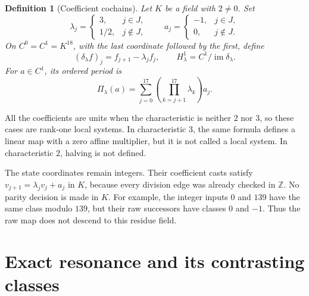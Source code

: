 \documentclass[11pt,letterpaper]{article}
\newcommand{\Z}{\mathbb{Z}}
\newtheorem{definition}[theorem]{Definition}
\begin{document}
\begin{definition}[Coefficient cochains]
Let \(K\) be a field with \(2\ne0\). Set
\[
\lambda_j=\begin{cases}3,&j\in J,\\1/2,&j\notin J,\end{cases}
\qquad
 a_j=\begin{cases}-1,&j\in J,\\0,&j\notin J.\end{cases}
\]
On \(C^0=C^1=K^{18}\), with the last coordinate followed by the first, define
\[
(\delta_\lambda f)_j=f_{j+1}-\lambda_jf_j,
\qquad H^1_\lambda=C^1/\operatorname{im}\delta_\lambda.
\]
For \(a\in C^1\), its ordered period is
\[
\Pi_\lambda(a)=\sum_{j=0}^{17}\left(\prod_{k=j+1}^{17}\lambda_k\right)a_j.
\]
\end{definition}

All the coefficients are units when the characteristic is neither \(2\) nor \(3\), so these cases are rank-one local systems. In characteristic \(3\), the same formula defines a linear map with a zero affine multiplier, but it is not called a local system. In characteristic \(2\), halving is not defined.

The state coordinates remain integers. Their coefficient casts satisfy \(v_{j+1}=\lambda_jv_j+a_j\) in \(K\), because every division edge was already checked in \(\Z\). No parity decision is made in \(K\). For example, the integer inputs \(0\) and \(139\) have the same class modulo \(139\), but their raw successors have classes \(0\) and \(-1\). Thus the raw map does not descend to this residue field.

\section{Exact resonance and its contrasting classes}
\end{document}
